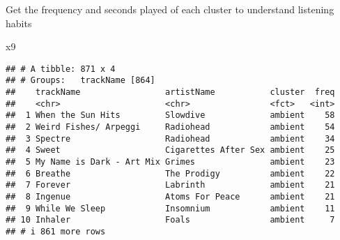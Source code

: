 \documentclass[
]{article}
\newenvironment{Shaded}{\begin{snugshade}}{\end{snugshade}}
\newcommand{\NormalTok}[1]{#1}
\begin{document}
Get the frequency and seconds played of each cluster to understand
listening habits

\begin{Shaded}
\begin{Highlighting}[]
\NormalTok{x9}
\end{Highlighting}
\end{Shaded}

\begin{verbatim}
## # A tibble: 871 x 4
## # Groups:   trackName [864]
##    trackName                 artistName           cluster  freq
##    <chr>                     <chr>                <fct>   <int>
##  1 When the Sun Hits         Slowdive             ambient    58
##  2 Weird Fishes/ Arpeggi     Radiohead            ambient    54
##  3 Spectre                   Radiohead            ambient    34
##  4 Sweet                     Cigarettes After Sex ambient    25
##  5 My Name is Dark - Art Mix Grimes               ambient    23
##  6 Breathe                   The Prodigy          ambient    22
##  7 Forever                   Labrinth             ambient    21
##  8 Ingenue                   Atoms For Peace      ambient    21
##  9 While We Sleep            Insomnium            ambient    11
## 10 Inhaler                   Foals                ambient     7
## # i 861 more rows
\end{verbatim}
\end{document}
